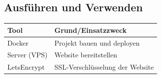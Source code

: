 \documentclass[a4paper,11pt]{scrartcl}
\begin{document}
\subsection{Ausführen und Verwenden}

\begin{table}[H]
\begin{center}
\begin{tabular}{|p{4cm}|p{8cm}|}
\hline
\textbf{Tool} &\textbf{Grund/Einsatzzweck} \\ \hline
Docker & Projekt bauen und deployen\\ \hline
Server (VPS) & Website bereitstellen\\ \hline
LetsEncrypt & SSL-Verschlüsselung der Website\\ \hline
\end{tabular}
\end{center}
\end{table}


\end{document}
